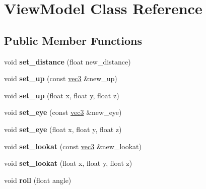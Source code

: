 \hypertarget{classViewModel}{\section{View\-Model Class Reference}
\label{classViewModel}
}
\subsection*{Public Member Functions}
\begin{DoxyCompactItemize}
\item 
\hypertarget{classViewModel_af9299a98815fbc42cfc9c2f6136fb2e0}{void {\bfseries set\-\_\-distance} (float new\-\_\-distance)}\label{classViewModel_af9299a98815fbc42cfc9c2f6136fb2e0}

\item 
\hypertarget{classViewModel_afc1b283729f3b4f2b86e6eed525a8d6c}{void {\bfseries set\-\_\-up} (const \hyperlink{classvec3}{vec3} \&new\-\_\-up)}\label{classViewModel_afc1b283729f3b4f2b86e6eed525a8d6c}

\item 
\hypertarget{classViewModel_a7be5971c5c88befdc4b3dd8698d58112}{void {\bfseries set\-\_\-up} (float x, float y, float z)}\label{classViewModel_a7be5971c5c88befdc4b3dd8698d58112}

\item 
\hypertarget{classViewModel_a60b8c6db3755fcd6b1d626865b649756}{void {\bfseries set\-\_\-eye} (const \hyperlink{classvec3}{vec3} \&new\-\_\-eye)}\label{classViewModel_a60b8c6db3755fcd6b1d626865b649756}

\item 
\hypertarget{classViewModel_a8792727a58c1599e30cf9651b34c3c91}{void {\bfseries set\-\_\-eye} (float x, float y, float z)}\label{classViewModel_a8792727a58c1599e30cf9651b34c3c91}

\item 
\hypertarget{classViewModel_a46805fb8ba468e136485af1eb6743644}{void {\bfseries set\-\_\-lookat} (const \hyperlink{classvec3}{vec3} \&new\-\_\-lookat)}\label{classViewModel_a46805fb8ba468e136485af1eb6743644}

\item 
\hypertarget{classViewModel_af78c9426b4c0a85381fe0db6a3d0e5d9}{void {\bfseries set\-\_\-lookat} (float x, float y, float z)}\label{classViewModel_af78c9426b4c0a85381fe0db6a3d0e5d9}

\item 
\hypertarget{classViewModel_ad329cb1380a037d1e552380f52521790}{void {\bfseries roll} (float angle)}\label{classViewModel_ad329cb1380a037d1e552380f52521790}


\end{DoxyCompactItemize}
